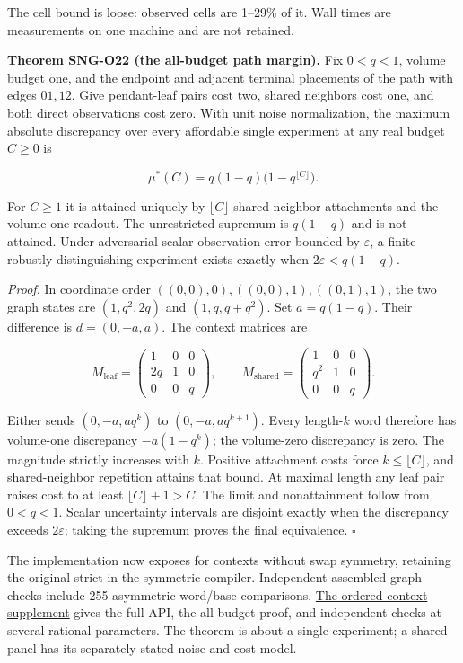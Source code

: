 \documentclass[
  11pt,
  a4paper,
]{report}
\let\singularitytexttt\texttt
\renewcommand{\texttt}[1]{\singularitytexttt{\seqsplit{#1}}}
\begin{document}
The cell bound is loose: observed cells are 1--29\% of it. Wall times
are measurements on one machine and are not retained.

\textbf{Theorem SNG-O22 (the all-budget path margin).} Fix \(0<q<1\),
volume budget one, and the endpoint and adjacent terminal placements of
the path with edges \(01,12\). Give pendant-leaf pairs cost two, shared
neighbors cost one, and both direct observations cost zero. With unit
noise normalization, the maximum absolute discrepancy over every
affordable single experiment at any real budget \(C\ge0\) is

\[
\mu^*(C)=q(1-q)\bigl(1-q^{\lfloor C\rfloor}\bigr).
\]

For \(C\ge1\) it is attained uniquely by \(\lfloor C\rfloor\)
shared-neighbor attachments and the volume-one readout. The unrestricted
supremum is \(q(1-q)\) and is not attained. Under adversarial scalar
observation error bounded by \(\varepsilon\), a finite robustly
distinguishing experiment exists exactly when \(2\varepsilon<q(1-q)\).

\emph{Proof.} In coordinate order \(((0,0),0),((0,0),1),((0,1),1)\), the
two graph states are \((1,q^2,2q)\) and \((1,q,q+q^2)\). Set
\(a=q(1-q)\). Their difference is \(d=(0,-a,a)\). The context matrices
are

\[
M_{\mathrm{leaf}}=\begin{pmatrix}1&0&0\\2q&1&0\\0&0&q\end{pmatrix},\qquad
M_{\mathrm{shared}}=\begin{pmatrix}1&0&0\\q^2&1&0\\0&0&q\end{pmatrix}.
\]

Either sends \((0,-a,aq^k)\) to \((0,-a,aq^{k+1})\). Every length-\(k\)
word therefore has volume-one discrepancy \(-a(1-q^k)\); the volume-zero
discrepancy is zero. The magnitude strictly increases with \(k\).
Positive attachment costs force \(k\le\lfloor C\rfloor\), and
shared-neighbor repetition attains that bound. At maximal length any
leaf pair raises cost to at least \(\lfloor C\rfloor+1>C\). The limit
and nonattainment follow from \(0<q<1\). Scalar uncertainty intervals
are disjoint exactly when the discrepancy exceeds \(2\varepsilon\);
taking the supremum proves the final equivalence. \(\square\)

The implementation now exposes \texttt{OrderedContextAttachment} for
contexts without swap symmetry, retaining the original strict
\texttt{ContextAttachment} in the symmetric compiler. Independent
assembled-graph checks include 255 asymmetric word/base comparisons.
\href{research/ORDERED_CONTEXTS.md}{The ordered-context supplement}
gives the full API, the all-budget proof, and independent checks at
several rational parameters. The theorem is about a single experiment; a
shared panel has its separately stated noise and cost model.
\end{document}
